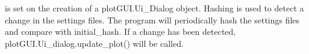 \documentclass[letterpaper,10pt,english]{sphinxmanual}
\begin{document}

\begin{fulllineitems}
\label{\detokenize{plotGUI:plotGUI.initial_hash}}
 is set on the creation of a plotGUI.Ui\_Dialog object.
Hashing is used to detect a change in the settings files.
The program will periodically hash the settings files and compare with initial\_hash.
If a change has been detected, plotGUI.Ui\_dialog.update\_plot() will be called.

\end{fulllineitems}

\end{document}
